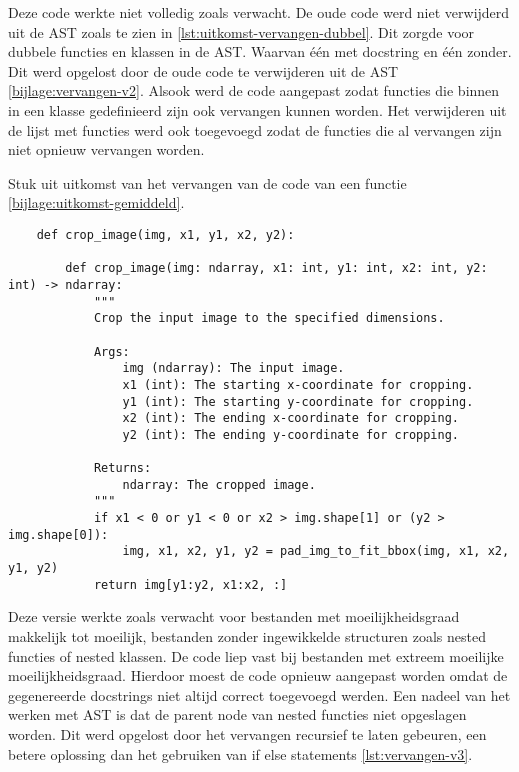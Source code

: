 Deze code werkte niet volledig zoals verwacht. De oude code werd niet verwijderd uit de AST zoals te zien in \ref{lst:uitkomst-vervangen-dubbel}. Dit zorgde voor dubbele functies en klassen in de AST.
Waarvan één met docstring en één zonder. Dit werd opgelost door de oude code te verwijderen uit de AST \ref{bijlage:vervangen-v2}.
Alsook werd de code aangepast zodat functies die binnen in een klasse gedefinieerd zijn ook vervangen kunnen worden.
Het verwijderen uit de lijst met functies werd ook toegevoegd zodat de functies die al vervangen zijn niet opnieuw vervangen worden.

\begin{listing}
    \caption{Stuk uit uitkomst van het vervangen van de code van een functie \ref{bijlage:uitkomst-gemiddeld}.}
    \label{lst:uitkomst-vervangen-dubbel}
    \begin{verbatim}
    def crop_image(img, x1, y1, x2, y2):

        def crop_image(img: ndarray, x1: int, y1: int, x2: int, y2: int) -> ndarray:
            """
            Crop the input image to the specified dimensions.

            Args:
                img (ndarray): The input image.
                x1 (int): The starting x-coordinate for cropping.
                y1 (int): The starting y-coordinate for cropping.
                x2 (int): The ending x-coordinate for cropping.
                y2 (int): The ending y-coordinate for cropping.

            Returns:
                ndarray: The cropped image.
            """
            if x1 < 0 or y1 < 0 or x2 > img.shape[1] or (y2 > img.shape[0]):
                img, x1, x2, y1, y2 = pad_img_to_fit_bbox(img, x1, x2, y1, y2)
            return img[y1:y2, x1:x2, :]
    \end{verbatim}
\end{listing}

Deze versie werkte zoals verwacht voor bestanden met moeilijkheidsgraad makkelijk tot moeilijk, bestanden zonder ingewikkelde structuren zoals nested functies of nested klassen.
De code liep vast bij bestanden met extreem moeilijke moeilijkheidsgraad.
Hierdoor moest de code opnieuw aangepast worden omdat de gegenereerde docstrings niet altijd correct toegevoegd werden.
Een nadeel van het werken met AST is dat de parent node van nested functies niet opgeslagen worden.
Dit werd opgelost door het vervangen recursief te laten gebeuren, een betere oplossing dan het gebruiken van if else statements \ref{lst:vervangen-v3}.

